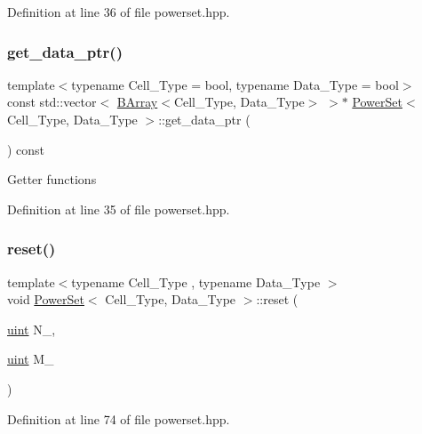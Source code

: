Definition at line 36 of file powerset.\+hpp.

\mbox{\label{class_power_set_a1ff9c2195a8d83b60813b38f5143693f}} 
\subsubsection{\texorpdfstring{get\+\_\+data\+\_\+ptr()}{get\_data\_ptr()}}
{\footnotesize\ttfamily template$<$typename Cell\+\_\+\+Type  = bool, typename Data\+\_\+\+Type  = bool$>$ \\
const std\+::vector$<$ \hyperlink{class_b_array}{B\+Array}$<$Cell\+\_\+\+Type, Data\+\_\+\+Type$>$ $>$$\ast$ \hyperlink{class_power_set}{Power\+Set}$<$ Cell\+\_\+\+Type, Data\+\_\+\+Type $>$\+::get\+\_\+data\+\_\+ptr (\begin{DoxyParamCaption}{ }\end{DoxyParamCaption}) const\hspace{0.3cm}{\ttfamily [inline]}}

Getter functions 

Definition at line 35 of file powerset.\+hpp.

\mbox{\label{class_power_set_a8074f5a6d44b6b7f6bad56d15576eb9f}} 
\subsubsection{\texorpdfstring{reset()}{reset()}}
{\footnotesize\ttfamily template$<$typename Cell\+\_\+\+Type , typename Data\+\_\+\+Type $>$ \\
void \hyperlink{class_power_set}{Power\+Set}$<$ Cell\+\_\+\+Type, Data\+\_\+\+Type $>$\+::reset (\begin{DoxyParamCaption}\item[{\hyperlink{typedefs_8hpp_a91ad9478d81a7aaf2593e8d9c3d06a14}{uint}}]{N\+\_\+,  }\item[{\hyperlink{typedefs_8hpp_a91ad9478d81a7aaf2593e8d9c3d06a14}{uint}}]{M\+\_\+ }\end{DoxyParamCaption})\hspace{0.3cm}{\ttfamily [inline]}}



Definition at line 74 of file powerset.\+hpp.




